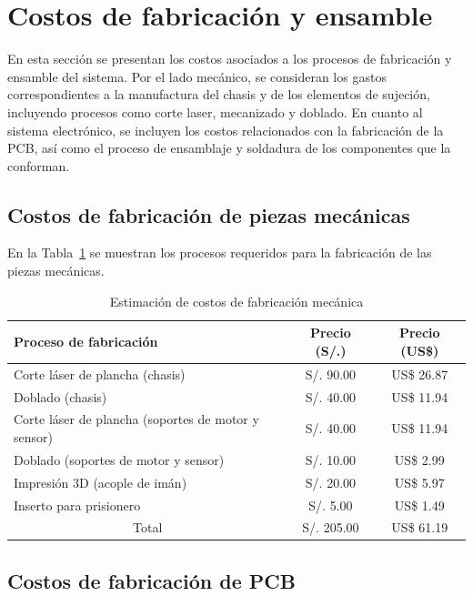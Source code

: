 \section{Costos de fabricación y ensamble}

\noindent
En esta sección se presentan los costos asociados a los procesos de fabricación y ensamble del sistema. Por el lado mecánico, se consideran los gastos correspondientes a la manufactura del chasis y de los elementos de sujeción, incluyendo procesos como corte laser, mecanizado y doblado. En cuanto al sistema electrónico, se incluyen los costos relacionados con la fabricación de la \ac{PCB}, así como el proceso de ensamblaje y soldadura de los componentes que la conforman.
\subsection{Costos de fabricación de piezas mecánicas}
\noindent
En la Tabla~\ref{tab:costos_fabricacion_mecanica_resumen} se muestran los procesos requeridos para la fabricación de las piezas mecánicas.
\begin{table}[H]
\centering
\caption{Estimación de costos de fabricación mecánica}
\label{tab:costos_fabricacion_mecanica_resumen}

\vspace{0.5em}

\begin{tabular}{|p{7cm}||c|c|}
\hline
Proceso de fabricación & Precio (S/.) & Precio (US\$) \\
\hline
Corte láser de plancha (chasis) 
& S/. 90.00 
& US\$ 26.87 \\
\hline
Doblado (chasis) 
& S/. 40.00 
& US\$ 11.94 \\
\hline
Corte láser de plancha (soportes de motor y sensor) 
& S/. 40.00 
& US\$ 11.94 \\
\hline
Doblado (soportes de motor y sensor) 
& S/. 10.00 
& US\$ 2.99 \\
\hline
Impresión 3D (acople de imán) 
& S/. 20.00 
& US\$ 5.97 \\
\hline
Inserto para prisionero 
& S/. 5.00 
& US\$ 1.49 \\
\hline
\multicolumn{1}{|c||}{Total} 
& S/. 205.00 
& US\$ 61.19 \\
\hline
\end{tabular}
\end{table}
\subsection{Costos de fabricación de \ac{PCB}}

